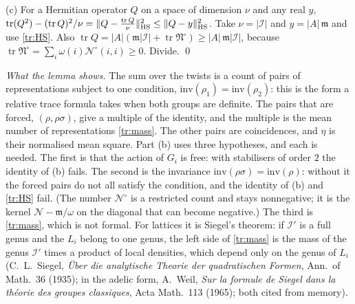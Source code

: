 \documentclass[11pt,letterpaper]{article}
\begin{document}
(c) For a Hermitian operator $Q$ on a space of dimension $\nu$ and any real $y$,
$\operatorname{tr}(Q^2)-(\operatorname{tr}Q)^2/\nu=\|Q-\frac{\operatorname{tr}Q}\nu\|_{\rm HS}^2\le\|Q-y\|_{\rm HS}^2$.
Take $\nu=|\mathcal I|$ and $y=|A|\,\mathfrak m$ and use \eqref{tr:HS}. Also
$\operatorname{tr}Q=|A|(\mathfrak m|\mathcal I|+\operatorname{tr}\mathfrak N^{\circ})\ge|A|\,\mathfrak m|\mathcal I|$,
because $\operatorname{tr}\mathfrak N^{\circ}=\sum_i\omega(i)\mathcal N^\circ(i,i)\ge0$. Divide. \qed

\emph{What the lemma shows.} The sum over the twists is a count of pairs of representations subject to one
condition, $\mathrm{inv}(\rho_1)=\mathrm{inv}(\rho_2)$: this is the form a relative trace formula takes when
both groups are definite. The pairs that are forced, $(\rho,\rho\sigma)$, give a multiple of the identity, and
the multiple is the mean number of representations \eqref{tr:mass}. The other pairs are coincidences, and
$\eta$ is their normalised mean square. Part (b) uses three hypotheses, and each is needed. The first is that
the action of $G_i$ is free: with stabilisers of order $2$ the identity of (b) fails. The second is the
invariance $\mathrm{inv}(\rho\sigma)=\mathrm{inv}(\rho)$: without it the forced pairs do not all satisfy the
condition, and the identity of (b) and \eqref{tr:HS} fail. (The number $\mathcal N^\circ$ is a restricted count
and stays nonnegative; it is the kernel $\mathcal N-\mathfrak m/\omega$ on the diagonal that can become
negative.) The third is \eqref{tr:mass}, which is not formal. For lattices it is Siegel's theorem: if
$\mathcal I'$ is a full genus and the $L_i$ belong to one genus, the left side of \eqref{tr:mass} is the mass
of the genus $\mathcal I'$ times a product of local densities, which depend only on the genus of $L_i$
(C.~L.~Siegel, \emph{\"Uber die analytische Theorie der quadratischen Formen}, Ann.\ of Math.\ 36 (1935); in
the adelic form, A.~Weil, \emph{Sur la formule de Siegel dans la th\'eorie des groupes classiques}, Acta
Math.\ 113 (1965); both cited from memory).
\end{document}
